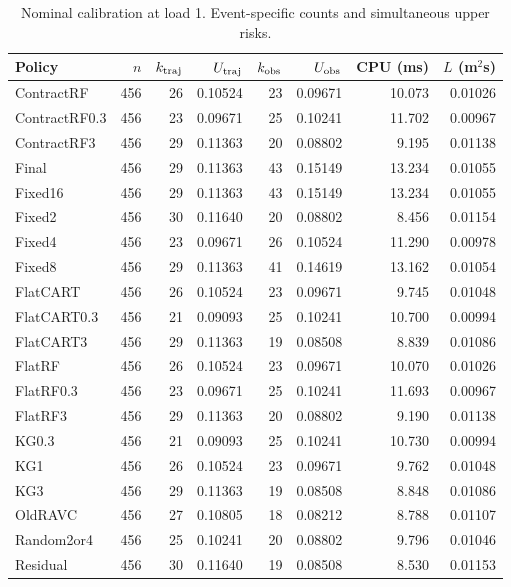 \begin{table}[!htbp]\centering\footnotesize
\caption{Nominal calibration at load 1. Event-specific counts and simultaneous upper risks.}\label{supp:calnominal_calibration1}
\begin{tabular}{@{}lrrrrrrr@{}}\toprule
Policy & $n$ & $k_{\rm traj}$ & $U_{\rm traj}$ & $k_{\rm obs}$ & $U_{\rm obs}$ & CPU (ms) & $L$ (m$^2$s)\\\midrule
ContractRF & 456 & 26 & 0.10524 & 23 & 0.09671 & 10.073 & 0.01026\\
ContractRF0.3 & 456 & 23 & 0.09671 & 25 & 0.10241 & 11.702 & 0.00967\\
ContractRF3 & 456 & 29 & 0.11363 & 20 & 0.08802 & 9.195 & 0.01138\\
Final & 456 & 29 & 0.11363 & 43 & 0.15149 & 13.234 & 0.01055\\
Fixed16 & 456 & 29 & 0.11363 & 43 & 0.15149 & 13.234 & 0.01055\\
Fixed2 & 456 & 30 & 0.11640 & 20 & 0.08802 & 8.456 & 0.01154\\
Fixed4 & 456 & 23 & 0.09671 & 26 & 0.10524 & 11.290 & 0.00978\\
Fixed8 & 456 & 29 & 0.11363 & 41 & 0.14619 & 13.162 & 0.01054\\
FlatCART & 456 & 26 & 0.10524 & 23 & 0.09671 & 9.745 & 0.01048\\
FlatCART0.3 & 456 & 21 & 0.09093 & 25 & 0.10241 & 10.700 & 0.00994\\
FlatCART3 & 456 & 29 & 0.11363 & 19 & 0.08508 & 8.839 & 0.01086\\
FlatRF & 456 & 26 & 0.10524 & 23 & 0.09671 & 10.070 & 0.01026\\
FlatRF0.3 & 456 & 23 & 0.09671 & 25 & 0.10241 & 11.693 & 0.00967\\
FlatRF3 & 456 & 29 & 0.11363 & 20 & 0.08802 & 9.190 & 0.01138\\
KG0.3 & 456 & 21 & 0.09093 & 25 & 0.10241 & 10.730 & 0.00994\\
KG1 & 456 & 26 & 0.10524 & 23 & 0.09671 & 9.762 & 0.01048\\
KG3 & 456 & 29 & 0.11363 & 19 & 0.08508 & 8.848 & 0.01086\\
OldRAVC & 456 & 27 & 0.10805 & 18 & 0.08212 & 8.788 & 0.01107\\
Random2or4 & 456 & 25 & 0.10241 & 20 & 0.08802 & 9.796 & 0.01046\\
Residual & 456 & 30 & 0.11640 & 19 & 0.08508 & 8.530 & 0.01153\\
\bottomrule\end{tabular}\end{table}

